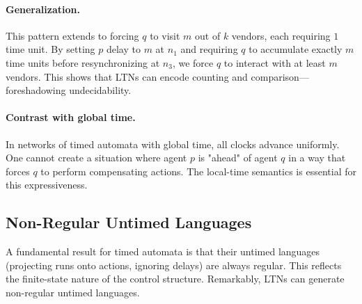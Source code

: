 \paragraph{Generalization.} This pattern extends to forcing $q$ to visit $m$ out of $k$ vendors, each requiring $1$ time unit. By setting $p$ delay to $m$ at $n_1$ and requiring $q$ to accumulate exactly $m$ time units before resynchronizing at $n_3$, we force $q$ to interact with at least $m$ vendors. This shows that LTNs can encode counting and comparison—foreshadowing undecidability.

\paragraph{Contrast with global time.} In networks of timed automata with global time, all clocks advance uniformly. One cannot create a situation where agent $p$ is "ahead" of agent $q$ in a way that forces $q$ to perform compensating actions. The local-time semantics is essential for this expressiveness.

\subsection{Non-Regular Untimed Languages}
\label{subsec:ltn-nonregular}

A fundamental result for timed automata is that their untimed languages (projecting runs onto actions, ignoring delays) are always regular. This reflects the finite-state nature of the control structure. Remarkably, LTNs can generate non-regular untimed languages.

